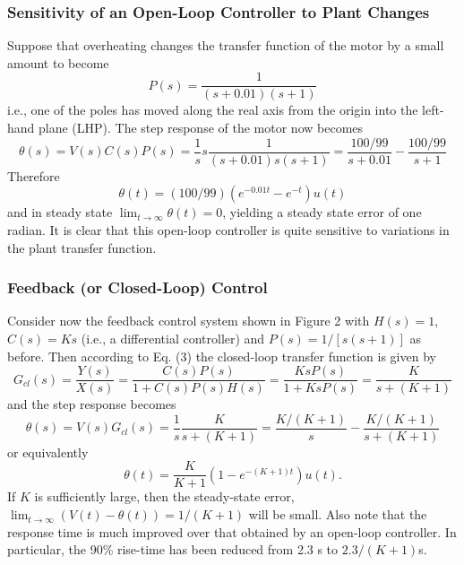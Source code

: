 \documentclass[a4paper]{article}
\begin{document}
\subsubsection{Sensitivity of an Open-Loop Controller to Plant Changes}
Suppose that overheating changes the transfer function of the motor by a small amount to become
\begin{equation}
    P(s)=\frac{1}{(s+0.01)(s+1)}
\end{equation}
i.e., one of the poles has moved along the real axis from the origin into the left-hand plane (LHP). The step response of the motor now becomes
\begin{equation}
    \theta(s)=V(s)C(s)P(s)=\frac{1}{s}s\frac{1}{(s+0.01)s(s+1)}=\frac{100/99}{s+0.01}-\frac{100/99}{s+1}
\end{equation}
Therefore
\begin{equation}
    \theta(t)=(100/99)(e^{-0.01t}-e^{-t})u(t)
\end{equation}
and in steady state $\lim_{t\rightarrow\infty}\theta(t)=0$, yielding a steady state error of one radian. It is clear that this open-loop controller is quite sensitive to variations in the plant transfer function.
\subsubsection{Feedback (or Closed-Loop) Control}
Consider now the feedback control system shown in Figure 2 with $H(s)=1$, $C(s)=Ks$ (i.e., a differential controller) and $P(s)=1/[s(s+1)]$ as before. Then according to Eq. (3) the closed-loop transfer function is given by
\begin{equation}
    G_{cl}(s)=\frac{Y(s)}{X(s)}=\frac{C(s)P(s)}{1+C(s)P(s)H(s)}=\frac{KsP(s)}{1+KsP(s)}=\frac{K}{s+(K+1)}
\end{equation}
and the step response becomes
\begin{equation}
    \theta(s)=V(s)G_{cl}(s)=\frac{1}{s}\frac{K}{s+(K+1)}=\frac{K/(K+1)}{s}-\frac{K/(K+1)}{s+(K+1)}
\end{equation}
or equivalently
\begin{equation}
    \theta(t)=\frac{K}{K+1}(1-e^{-(K+1)t})u(t).
\end{equation}
If $K$ is sufficiently large, then the steady-state error, $\lim_{t\rightarrow\infty}(V(t)-\theta(t))=1/(K+1)$ will be small. Also note that the response time is much improved over that obtained by an open-loop controller. In particular, the 90\% rise-time has been reduced from 2.3 s to $2.3/(K+1)$s.
\end{document}
